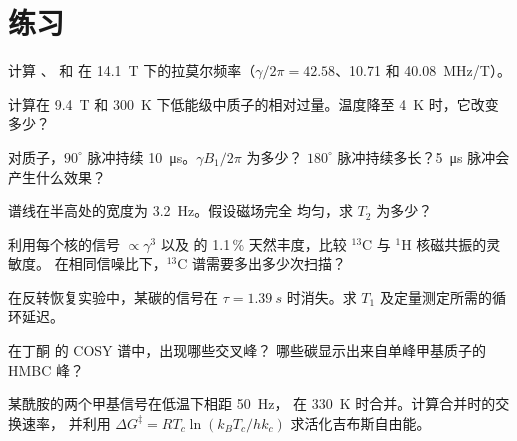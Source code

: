 \section{练习}

\begin{exercise}[$\star$]\label{exo:b3:advanced-nmr:1}
计算 、 和  在 \qty{14.1}{T}
下的拉莫尔频率（$\gamma/2\pi = 42.58$、10.71 和 \qty{40.08}{MHz/T}）。
\end{exercise}

\begin{exercise}[$\star$]\label{exo:b3:advanced-nmr:2}
计算在 \qty{9.4}{T} 和
\qty{300}{K} 下低能级中质子的相对过量。温度降至 \qty{4}{K} 时，它改变多少？
\end{exercise}

\begin{exercise}[$\star$]\label{exo:b3:advanced-nmr:3}
对质子，$90^\circ$ 脉冲持续 \qty{10}{\micro s}。$\gamma B_1/2\pi$ 为多少？
$180^\circ$ 脉冲持续多长？\qty{5}{\micro s} 脉冲会产生什么效果？
\end{exercise}

\begin{exercise}[$\star$]\label{exo:b3:advanced-nmr:4}
谱线在半高处的宽度为 \qty{3.2}{Hz}。假设磁场完全
均匀，求 $T_2$ 为多少？
\end{exercise}

\begin{exercise}[$\star\star$]\label{exo:b3:advanced-nmr:5}
利用每个核的信号 $\propto\gamma^3$ 以及
 的 1.1\,\% 天然丰度，比较 ${}^{13}$C 与 ${}^1$H 核磁共振的灵敏度。
在相同信噪比下，${}^{13}$C 谱需要多出多少次扫描？
\end{exercise}

\begin{exercise}[$\star\star$]\label{exo:b3:advanced-nmr:6}
在反转恢复实验中，某碳的信号在
$\tau = \qty{1.39}{s}$ 时消失。求 $T_1$ 及定量测定所需的循环延迟。
\end{exercise}

\begin{exercise}[$\star\star$]\label{exo:b3:advanced-nmr:7}
在丁酮  的 COSY 谱中，出现哪些交叉峰？
哪些碳显示出来自单峰甲基质子的 HMBC 峰？
\end{exercise}

\begin{exercise}[$\star\star$]\label{exo:b3:advanced-nmr:8}
某酰胺的两个甲基信号在低温下相距 \qty{50}{Hz}，
在 \qty{330}{K} 时合并。计算合并时的交换速率，
并利用 $\Delta G^\ddagger = RT_c\ln(k_BT_c/hk_c)$ 求活化吉布斯自由能。
\end{exercise}

